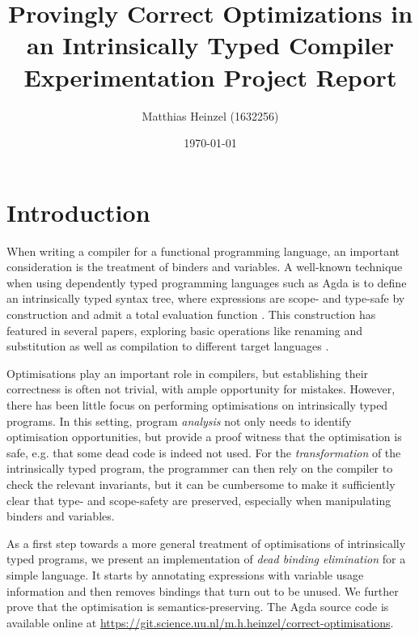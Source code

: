 \documentclass[11pt,a4paper]{article}
\title{Provingly Correct Optimizations in an Intrinsically Typed Compiler\\
  \vspace{1cm}
  \large Experimentation Project Report}
\author{Matthias Heinzel (1632256)}
\date{\today}
\newcommand{\Draft}[1]{\todo[inline,bordercolor=gray,textcolor=gray,backgroundcolor=gray!20]{#1}}
\begin{document}
\maketitle
\tableofcontents
\pagebreak

\section{Introduction}

When writing a compiler for a functional programming language,
an important consideration is the treatment of binders and variables.
A well-known technique when using dependently typed programming languages such as Agda
\cite{norell2007agda}
is to define an intrinsically typed syntax tree,
where expressions are scope- and type-safe by construction and admit a total evaluation function
\cite{augustsson1999intrinsic}.
This construction has featured in several papers, exploring
basic operations like renaming and substitution
\cite{allais2018universe}
as well as compilation to different target languages
\cite[supplemental material]{pickard2021calculating}.

Optimisations play an important role in compilers, but
establishing their correctness is often not trivial,
with ample opportunity for mistakes.
However, there has been little focus on performing optimisations on intrinsically typed programs.
%
In this setting, program \emph{analysis} not only needs to identify optimisation opportunities,
but provide a proof witness that the optimisation is safe,
e.g. that some dead code is indeed not used.
For the \emph{transformation} of the intrinsically typed program,
the programmer can then rely on the compiler to check the relevant invariants,
but it can be cumbersome to make it sufficiently clear that type- and scope-safety are preserved,
especially when manipulating binders and variables.

As a first step towards a more general treatment of optimisations of intrinsically typed programs,
we present an implementation of \emph{dead binding elimination} for a simple language.
It starts by annotating expressions with variable usage information
and then removes bindings that turn out to be unused.
We further prove that the optimisation is semantics-preserving.
The Agda source code is available online at
\url{https://git.science.uu.nl/m.h.heinzel/correct-optimisations}.
\end{document}
